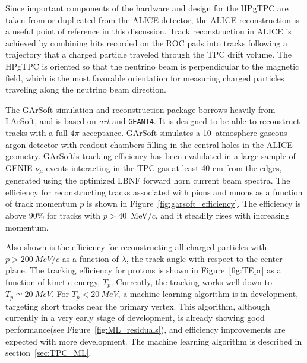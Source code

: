 %

Since important components of the hardware and design for the HPgTPC are taken from or duplicated from the ALICE detector, the ALICE reconstruction is a useful point of reference in this discussion.
Track reconstruction in ALICE is achieved by combining hits recorded on the ROC pads into tracks following a trajectory that a charged particle traveled through the TPC drift volume.  The HPgTPC is oriented so that the neutrino beam is perpendicular to the magnetic field, which is the most favorable orientation for measuring charged particles traveling along the neutrino beam direction.   

The GArSoft simulation and reconstruction package borrows heavily from LArSoft, and is based on {\it art} and {\tt GEANT4}.  It is designed to be able to reconstruct tracks with a full $4\pi$ acceptance.   GArSoft simulates a 10~atmosphere gaseous argon detector with readout chambers filling in the central holes in the ALICE geometry.  GArSoft's tracking efficiency has been evalulated in a large sample of GENIE $\nu_\mu$ events interacting in the TPC gas at least 40 cm from the edges, generated using the optimized LBNF forward horn current beam spectra. The efficiency
for reconstructing tracks associated with pions and muons as a function of track momentum $p$ is shown in  Figure~\ref{fig:garsoft_efficiency}.  The efficiency is above 90\% for tracks with $p>40$~MeV/$c$, and it steadily rises with increasing momentum.  

Also shown is the efficiency for reconstructing all charged particles with $p>\SI{200}{MeV/c}$ as a function of $\lambda$,  the track angle with respect to the center plane.  The tracking efficiency for protons is shown in Figure~\ref{fig:TEpr} as a function of kinetic energy, $T_p$.  Currently, the tracking works well down to $T_p \simeq \SI{20}{MeV}$. For $T_p < \SI{20}{MeV}$, a machine-learning algorithm is in development, targeting short tracks near the primary vertex. This algorithm, although currently in a very early stage of development, is already showing good performance(see Figure~\ref{fig:ML_residuals}), and efficiency improvements are expected with more development. The machine learning algorithm is described in section~\ref{sec:TPC_ML}.

